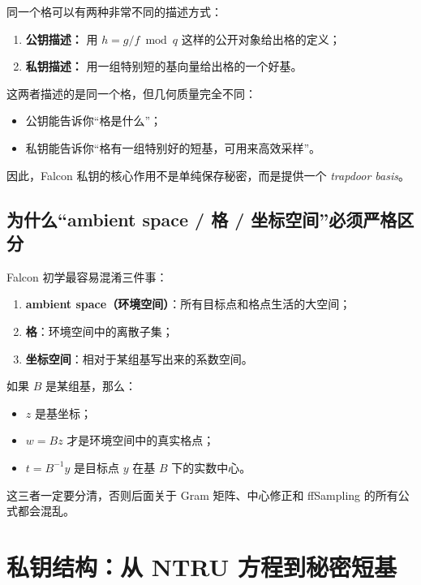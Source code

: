 \documentclass[11pt,a4paper]{ctexart}
\begin{document}
同一个格可以有两种非常不同的描述方式：

\begin{enumerate}
    \item \textbf{公钥描述：} 用 \(h=g/f \bmod q\) 这样的公开对象给出格的定义；
    \item \textbf{私钥描述：} 用一组特别短的基向量给出格的一个好基。
\end{enumerate}

这两者描述的是同一个格，但几何质量完全不同：

\begin{itemize}
    \item 公钥能告诉你“格是什么”；
    \item 私钥能告诉你“格有一组特别好的短基，可用来高效采样”。
\end{itemize}

因此，Falcon 私钥的核心作用不是单纯保存秘密，而是提供一个 \emph{trapdoor basis}。

\subsection{为什么“ambient space / 格 / 坐标空间”必须严格区分}

Falcon 初学最容易混淆三件事：

\begin{enumerate}
    \item \textbf{ambient space（环境空间）}：所有目标点和格点生活的大空间；
    \item \textbf{格}：环境空间中的离散子集；
    \item \textbf{坐标空间}：相对于某组基写出来的系数空间。
\end{enumerate}

如果 \(B\) 是某组基，那么：

\begin{itemize}
    \item \(z\) 是基坐标；
    \item \(w=Bz\) 才是环境空间中的真实格点；
    \item \(t=B^{-1}y\) 是目标点 \(y\) 在基 \(B\) 下的实数中心。
\end{itemize}

这三者一定要分清，否则后面关于 Gram 矩阵、中心修正和 ffSampling 的所有公式都会混乱。

\section{私钥结构：从 NTRU 方程到秘密短基}
\end{document}
